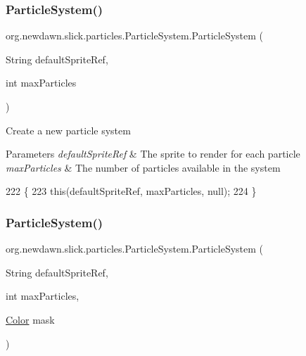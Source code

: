 \subsubsection{\texorpdfstring{Particle\+System()}{ParticleSystem()}\hspace{0.1cm}{\footnotesize\ttfamily [3/5]}}
{\footnotesize\ttfamily org.\+newdawn.\+slick.\+particles.\+Particle\+System.\+Particle\+System (\begin{DoxyParamCaption}\item[{String}]{default\+Sprite\+Ref,  }\item[{int}]{max\+Particles }\end{DoxyParamCaption})\hspace{0.3cm}{\ttfamily [inline]}}

Create a new particle system


\begin{DoxyParams}{Parameters}
{\em default\+Sprite\+Ref} & The sprite to render for each particle \\
\hline
{\em max\+Particles} & The number of particles available in the system \\
\hline
\end{DoxyParams}

\begin{DoxyCode}
222                                                                      \{
223         \textcolor{keyword}{this}(defaultSpriteRef, maxParticles, null);
224     \}
\end{DoxyCode}
\mbox{\label{classorg_1_1newdawn_1_1slick_1_1particles_1_1_particle_system_afc839092dcd936aaa301a6de796eb014}} 
\subsubsection{\texorpdfstring{Particle\+System()}{ParticleSystem()}\hspace{0.1cm}{\footnotesize\ttfamily [4/5]}}
{\footnotesize\ttfamily org.\+newdawn.\+slick.\+particles.\+Particle\+System.\+Particle\+System (\begin{DoxyParamCaption}\item[{String}]{default\+Sprite\+Ref,  }\item[{int}]{max\+Particles,  }\item[{\mbox{\hyperlink{classorg_1_1newdawn_1_1slick_1_1_color}{Color}}}]{mask }\end{DoxyParamCaption})\hspace{0.3cm}{\ttfamily [inline]}}

